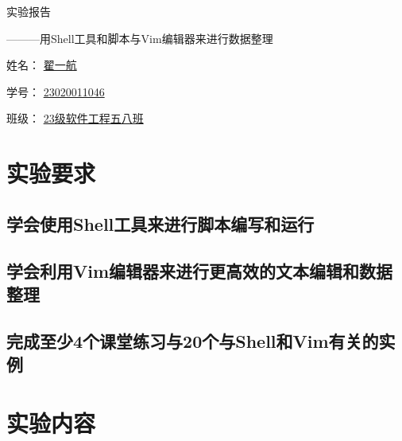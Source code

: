 \documentclass[UTF8,a4paper]{ctexart}
\begin{document}
\begin{sloppypar}
	
	\begin{center}
		\begin{fontsize}{80pt}{20pt}
			实验报告
		\end{fontsize}

		\bigskip
		\bigskip
		
		\begin{fontsize}{35pt}{20pt}
			\begin{flushright}
				———用{\Huge Shell}工具和脚本与{\Huge Vim}编辑器来进行数据整理
			\end{flushright}
		\end{fontsize}
		
		\bigskip
		\bigskip
		\bigskip
		\bigskip
		\bigskip
		\bigskip
		\bigskip
		\bigskip
		\bigskip
		\bigskip
		\bigskip
		\bigskip
		\bigskip
		\bigskip
		\bigskip
		\bigskip
		\bigskip
		\bigskip
		\bigskip
		\bigskip
		\bigskip
		\bigskip
		
		\begin{fontsize}{25pt}{20pt}
			姓名：
			\underline{翟一航}
			
			\bigskip
			\bigskip
			\bigskip
			\bigskip
			
			学号：
			\underline{{\huge 23020011046}}
			
			\bigskip
			\bigskip
			\bigskip
			\bigskip
			
			班级：
			\underline{{\Huge 23}级软件工程五八班}
			
			
		\end{fontsize}
	\end{center}
	\section{实验要求}
	\subsection{学会使用Shell工具来进行脚本编写和运行}
	\subsection{学会利用Vim编辑器来进行更高效的文本编辑和数据整理}
	\subsection{完成至少4个课堂练习与20个与Shell和Vim有关的实例}
	\section{实验内容}

\end{sloppypar}
\end{document}
